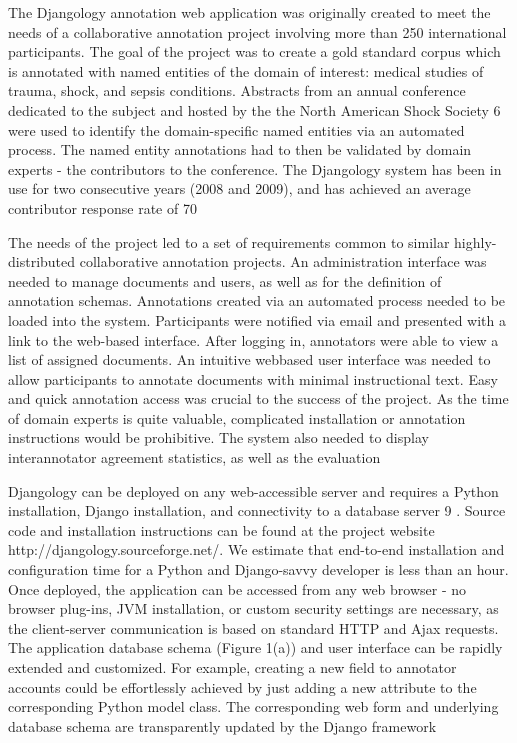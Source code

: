 \begin{description}
    The Djangology
    annotation web application was originally created to meet the needs of a collaborative annotation
    project involving more than 250 international participants.
    The goal of the project was to create a gold standard corpus
    which is annotated with named entities of the domain
    of interest: medical studies of trauma, shock, and sepsis
    conditions. Abstracts from an annual conference dedicated
    to the subject and hosted by the the North American
    Shock Society 6 were used to identify the domain-specific
    named entities via an automated process. The named entity
    annotations had to then be validated by domain experts -
    the contributors to the conference. The Djangology system
    has been in use for two consecutive years (2008 and 2009),
    and has achieved an average contributor response rate of
    70%

    The needs of the project led to a set of requirements common to similar highly-distributed collaborative annotation
    projects. An administration interface was needed to manage documents and users, as well as for the definition of
    annotation schemas. Annotations created via an automated
    process needed to be loaded into the system. Participants
    were notified via email and presented with a link to the
    web-based interface. After logging in, annotators were able
    to view a list of assigned documents. An intuitive webbased user interface was needed to allow participants to annotate documents with minimal instructional text. Easy and
    quick annotation access was crucial to the success of the
    project. As the time of domain experts is quite valuable,
    complicated installation or annotation instructions would
    be prohibitive. The system also needed to display interannotator agreement statistics, as well as the evaluation

    Djangology can be deployed on any web-accessible server
    and requires a Python installation, Django installation, and
    connectivity to a database server 9
    . Source code and installation instructions can be found at the project website http://djangology.sourceforge.net/. We estimate that
    end-to-end installation and configuration time for a Python
    and Django-savvy developer is less than an hour. Once
    deployed, the application can be accessed from any web
    browser - no browser plug-ins, JVM installation, or custom
    security settings are necessary, as the client-server communication is based on standard HTTP and Ajax requests.
    The application database schema (Figure 1(a)) and user interface can be rapidly extended and customized. For example, creating a new field to annotator accounts could be
    effortlessly achieved by just adding a new attribute to the
    corresponding Python model class. The corresponding web
    form and underlying database schema are transparently updated by the Django framework


\end{description}
